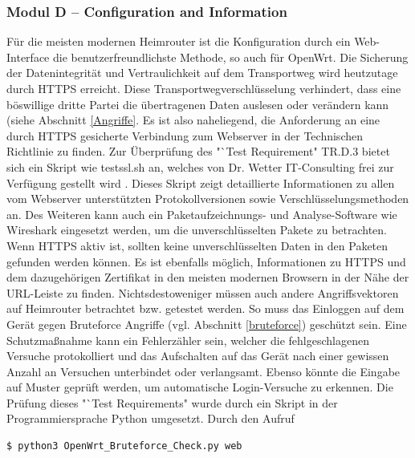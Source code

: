 \documentclass[a4paper]{book}
\begin{document}
\begin{large}
\subsubsection{Modul D – Configuration and Information}
\begin{onehalfspace}
Für die meisten modernen Heimrouter ist die Konfiguration durch ein Web-Interface die benutzerfreundlichste Methode, so auch für OpenWrt. Die Sicherung der Datenintegrität und Vertraulichkeit auf dem Transportweg wird heutzutage durch HTTPS erreicht. Diese Transportwegverschlüsselung verhindert, dass eine böswillige dritte Partei die übertragenen Daten auslesen oder verändern kann (siehe Abschnitt \ref{Angriffe}. Es ist also naheliegend, die Anforderung an eine durch HTTPS gesicherte Verbindung zum Webserver in der Technischen Richtlinie zu finden. Zur Überprüfung des "`Test Requirement"{} TR.D.3 bietet sich ein Skript wie testssl.sh an, welches von Dr. Wetter IT-Consulting frei zur Verfügung gestellt wird \cite{D.Wetter.2020}. Dieses Skript zeigt detaillierte Informationen zu allen vom Webserver unterstützten Protokollversionen sowie Verschlüsselungsmethoden an. Des Weiteren kann auch ein Paketaufzeichnungs- und Analyse-Software wie Wireshark eingesetzt werden, um die unverschlüsselten Pakete zu betrachten. Wenn HTTPS aktiv ist, sollten keine unverschlüsselten Daten in den Paketen gefunden werden können. Es ist ebenfalls möglich, Informationen zu HTTPS und dem dazugehörigen Zertifikat in den meisten modernen Browsern in der Nähe der URL-Leiste zu finden. \newline\indent	
	Nichtsdestoweniger müssen auch andere Angriffsvektoren auf Heimrouter betrachtet bzw. getestet werden. So muss das Einloggen auf dem Gerät gegen Bruteforce Angriffe (vgl. Abschnitt \ref{bruteforce}) geschützt sein. Eine Schutzmaßnahme kann ein Fehlerzähler sein, welcher die fehlgeschlagenen Versuche protokolliert und das Aufschalten auf das Gerät nach einer gewissen Anzahl an Versuchen unterbindet oder verlangsamt. Ebenso könnte die Eingabe auf Muster geprüft werden, um automatische Login-Versuche zu erkennen. Die Prüfung dieses "`Test Requirements"{} wurde durch ein Skript in der Programmiersprache Python umgesetzt. Durch den Aufruf 	\\

\begin{lstlisting}[language=sh,caption={OpenWrt Webserver mit Python Skript auf Resistenz gegen Bruteforce Angriffe testen. (Das Programm ist auf dem Datenträger verfügbar) }]
$ python3 OpenWrt_Bruteforce_Check.py web 
\end{lstlisting}


\end{onehalfspace}
\end{large}
\end{document}
